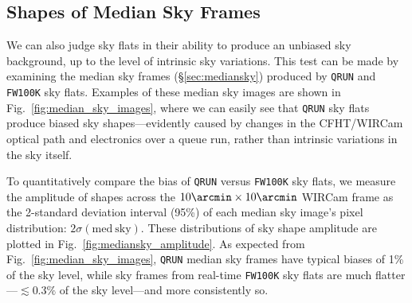 \documentclass[iop]{emulateapj}
\newcommand{\Fig}[1]{Fig.~\ref{fig:#1}}  %
\newcommand{\Sec}[1]{\S\ref{sec:#1}}  %
\begin{document}
\subsection{Shapes of Median Sky Frames}
\label{sec:medianskyshapes}

We can also judge sky flats in their ability to produce an unbiased sky background, up to the level of intrinsic sky variations.
This test can be made by examining the median sky frames (\Sec{mediansky}) produced by \texttt{QRUN} and \texttt{FW100K} sky flats.
Examples of these median sky images are shown in \Fig{median_sky_images}, where we can easily see that \texttt{QRUN} sky flats produce biased sky shapes---evidently caused by changes in the CFHT/WIRCam optical path and electronics over a queue run, rather than intrinsic variations in the sky itself.

To quantitatively compare the bias of \texttt{QRUN} versus \texttt{FW100K} sky flats, we measure the amplitude of shapes across the $10\arcmin \times 10\arcmin$ WIRCam frame as the 2-standard deviation interval (95\%) of each median sky image's pixel distribution: $2 \sigma(\mathrm{med~sky})$.
These distributions of sky shape amplitude are plotted in \Fig{mediansky_amplitude}.
As expected from \Fig{median_sky_images}, \texttt{QRUN} median sky frames have typical biases of 1\% of the sky level, while sky frames from real-time \texttt{FW100K} sky flats are much flatter---$\lesssim 0.3\%$ of the sky level---and more consistently so.
\end{document}
